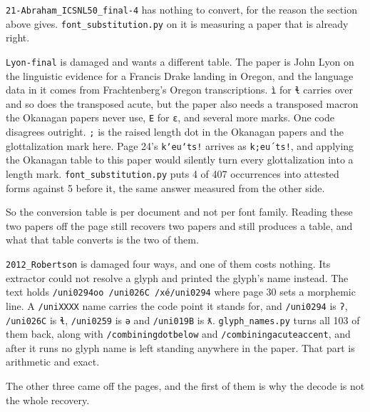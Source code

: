 \texttt{21-\allowbreak{}Abraham\_\allowbreak{}ICSNL50\_\allowbreak{}final-\allowbreak{}4} has nothing to convert, for the reason the section above gives. \texttt{font\_\allowbreak{}substitution.\allowbreak{}py} on it is measuring a paper that is already right.

\texttt{Lyon-\allowbreak{}final} is damaged and wants a different table. The paper is John Lyon on the linguistic evidence for a Francis Drake landing in Oregon, and the language data in it comes from Frachtenberg's Oregon transcriptions. \texttt{ì} for \texttt{ɬ} carries over and so does the transposed acute, but the paper also needs a transposed macron the Okanagan papers never use, \texttt{E} for \texttt{ɛ}, and several more marks. One code disagrees outright. \texttt{;} is the raised length dot in the Okanagan papers and the glottalization mark here. Page 24's \texttt{kʼeuʼts!} arrives as \texttt{k;eu´ts!}, and applying the Okanagan table to this paper would silently turn every glottalization into a length mark. \texttt{font\_\allowbreak{}substitution.\allowbreak{}py} puts 4 of 407 occurrences into attested forms against 5 before it, the same answer measured from the other side.

So the conversion table is per document and not per font family. Reading these two papers off the page still recovers two papers and still produces a table, and what that table converts is the two of them.

\texttt{2012\_\allowbreak{}Robertson} is damaged four ways, and one of them costs nothing. Its extractor could not resolve a glyph and printed the glyph's name instead. The text holds \texttt{/\allowbreak{}uni0294oo /\allowbreak{}uni026C /\allowbreak{}xé/\allowbreak{}uni0294} where page 30 sets a morphemic line. A \texttt{/\allowbreak{}uni\allowbreak{}XXXX} name carries the code point it stands for, and \texttt{/\allowbreak{}uni0294} is \texttt{ʔ}, \texttt{/\allowbreak{}uni026C} is \texttt{ɬ}, \texttt{/\allowbreak{}uni0259} is \texttt{ə} and \texttt{/\allowbreak{}uni019B} is \texttt{ƛ}. \texttt{glyph\_\allowbreak{}names.\allowbreak{}py} turns all 103 of them back, along with \texttt{/\allowbreak{}combiningdotbelow} and \texttt{/\allowbreak{}combiningacuteaccent}, and after it runs no glyph name is left standing anywhere in the paper. That part is arithmetic and exact.

The other three came off the pages, and the first of them is why the decode is not the whole recovery.

